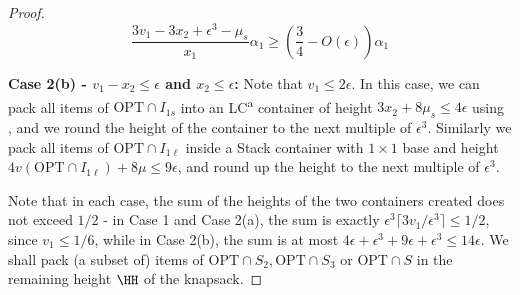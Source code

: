 \begin{proof}
    
    
    \[ \frac{3v_1-3x_2+\epsilon^3-\mu_s}{x_1}\alpha_1 \ge \left(\frac{3}{4}-O(\epsilon)\right)\alpha_1 \]
    
    \textbf{Case 2(b) - $v_1-x_2 \le \epsilon$ and $x_2\le \epsilon$:} Note that $v_1\le 2\epsilon$. In this case, we can pack all items of $\text{OPT}\cap I_{1s}$ into an LC\textsuperscript{a} container of height $3x_2+8\mu_s \le 4\epsilon$ using , and we round the height of the container to the next multiple of $\epsilon^3$. Similarly we pack all items of $\text{OPT}\cap I_{1\ell}$ inside a Stack container with $1\times 1$ base and height $4v(\text{OPT}\cap I_{1\ell})+8\mu \le 9\epsilon$, and round up the height to the next multiple of $\epsilon^3$. 

    Note that in each case, the sum of the heights of the two containers created does not exceed $1/2$ - in Case 1 and Case 2(a), the sum is exactly $\epsilon^3\lceil 3v_1/\epsilon^3\rceil \le 1/2$, since $v_1\le 1/6$, while in Case 2(b), the sum is at most $4\epsilon + \epsilon^3+9\epsilon+\epsilon^3 \le 14\epsilon$. We shall pack (a subset of) items of $\text{OPT}\cap S_2, \text{OPT}\cap S_3$ or $\text{OPT}\cap S$ in the remaining height $\HH$ of the knapsack.


\end{proof}
